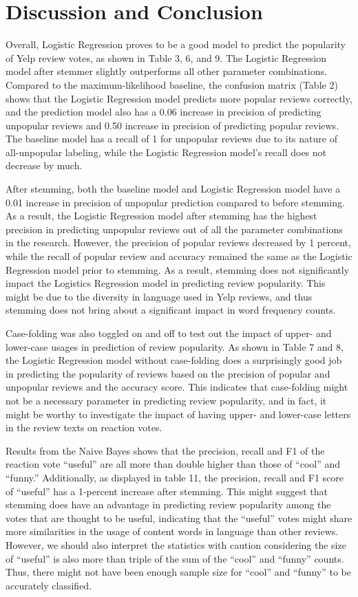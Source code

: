 \documentclass[11pt,a4paper]{article}
\begin{document}
\section{Discussion and Conclusion}

Overall, Logistic Regression proves to be a good model to predict the popularity of Yelp review votes, as shown in Table 3, 6, and 9. The Logistic Regression model after stemmer slightly outperforms all other parameter combinations. Compared to the maximum-likelihood baseline, the confusion matrix (Table 2) shows that the Logistic Regression model predicts more popular reviews correctly, and the prediction model also has a 0.06 increase in precision of predicting unpopular reviews and 0.50 increase in precision of predicting popular reviews. The baseline model has a recall of 1 for unpopular reviews due to its nature of all-unpopular labeling, while the Logistic Regression model’s recall does not decrease by much.

After stemming, both the baseline model and Logistic Regression model have a 0.01 increase in precision of unpopular prediction compared to before stemming. As a result, the Logistic Regression model after stemming has the highest precision in predicting unpopular reviews out of all the parameter combinations in the research. However, the precision of popular reviews decreased by 1 percent, while the recall of popular review and accuracy remained the same as the Logistic Regression model prior to stemming. As a result, stemming does not significantly impact the Logistics Regression model in predicting review popularity. This might be due to the diversity in language used in Yelp reviews, and thus stemming does not bring about a significant impact in word frequency counts.

Case-folding was also toggled on and off to test out the impact of upper- and lower-case usages in prediction of review popularity. As shown in Table 7 and 8, the Logistic Regression model without case-folding does a surprisingly good job in predicting the popularity of reviews based on the precision of popular and unpopular reviews and the accuracy score. This indicates that case-folding might not be a necessary parameter in predicting review popularity, and in fact, it might be worthy to investigate the impact of having upper- and lower-case letters in the review texts on reaction votes.

Results from the Naive Bayes shows that the precision, recall and F1 of the reaction vote “useful” are all more than double higher than those of “cool” and “funny.” Additionally, as displayed in table 11, the precision, recall and F1 score of “useful” has a 1-percent increase after stemming. This might suggest that stemming does have an advantage in predicting review popularity among the votes that are thought to be useful, indicating that the “useful” votes might share more similarities in the usage of content words in language than other reviews. However, we should also interpret the statistics with caution considering the size of “useful” is also more than triple of the sum of the “cool” and “funny” counts. Thus, there might not have been enough sample size for “cool” and “funny” to be accurately classified.
\end{document}
